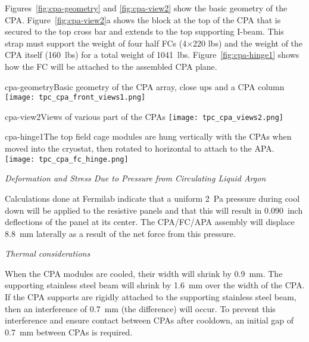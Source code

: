 
Figures~\ref{fig:cpa-geometry} and \ref{fig:cpa-view2} show the basic geometry of the CPA. Figure~\ref{fig:cpa-view2}a shows the block at the top of the CPA that is secured to the top cross bar and extends to the top supporting I-beam.  This strap must support the weight of four half FCs (4$\times$220 lbs) and the weight of the CPA itself (160~lbs) for a total weight of 1041~lbs. Figure~\ref{fig:cpa-hinge1} shows how the FC will be attached to the assembled CPA plane. 

\begin{cdrfigure}{cpa-geometry}{Basic geometry of the CPA array, close ups and a CPA column} 
\texttt{[image: tpc\_cpa\_front\_views1.png]}
\end{cdrfigure}

\begin{cdrfigure}{cpa-view2}{Views of various part of the CPAs} 
\texttt{[image: tpc\_cpa\_views2.png]}
\end{cdrfigure}

\begin{cdrfigure}{cpa-hinge1}{The top field cage modules are hung vertically with the CPAs when moved into the cryostat, then rotated to horizontal to attach to the APA.} 
\texttt{[image: tpc\_cpa\_fc\_hinge.png]}
\end{cdrfigure}


{\it Deformation and Stress Due to Pressure from Circulating Liquid Argon}

Calculations done at Fermilab indicate that a uniform 2~Pa pressure during cool down will be applied to the resistive panels  and that this will result in 0.090~inch deflections of the panel at its center.  The CPA/FC/APA assembly will displace 8.8~mm laterally as a result of the net force from this pressure.  

{\it Thermal considerations}

When the CPA modules are cooled, their width will shrink by 0.9~mm.  The supporting stainless steel beam will shrink by 1.6~mm over the width of the CPA.  If the CPA supports are rigidly attached to the supporting stainless steel beam, then an interference of 0.7~mm (the difference) will occur.  To prevent this interference and ensure contact between CPAs after cooldown, an initial gap of 0.7~mm between CPAs is required.  


